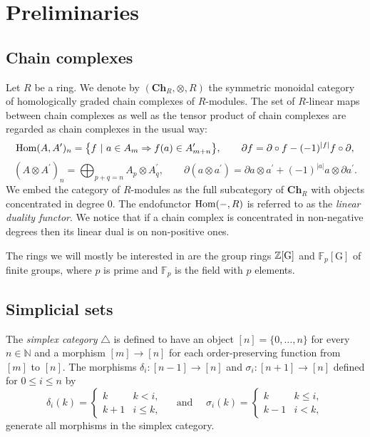 
\section{Preliminaries} \label{s:preliminaries}

\subsection{Chain complexes}
\label{s s:chain cpx}

Let $R$ be a ring. We denote by $(\mathbf{Ch}_R, \otimes, R)$ the symmetric monoidal category of homologically graded chain complexes of $R$-modules. The set of $R$-linear maps between chain complexes as well as the tensor product of chain complexes are regarded as chain complexes in the usual way:
\begin{equation*}
\mathrm{Hom}(A, A^\prime)_n = \big\{f \ |\ a \in A_m \Rightarrow f(a) \in A^\prime_{m+n} \big\}, \qquad
\partial f = \partial \circ f - (-1)^{|f|}f \circ \partial,
\end{equation*}
\begin{equation*}
(A \otimes A^\prime)_n = \bigoplus_{p + q = n} A_p \otimes A^\prime_q, \qquad \partial (a \otimes a^\prime) = \partial a \otimes a^\prime + (-1)^{|a|} a \otimes \partial a^\prime.
\end{equation*}
We embed the category of $R$-modules as the full subcategory of $\mathbf{Ch}_R$ with objects concentrated in degree $0$. The endofunctor $\mathrm{Hom}(-, R)$ is referred to as the \textit{linear duality functor}. We notice that if a chain complex is concentrated in non-negative degrees then its linear dual is on non-positive ones.

The rings we will mostly be interested in are the group rings $\mathbb{Z}[\mathrm G]$ and $\mathbb{F}_p[\mathrm G]$ of finite groups, where $p$ is prime and $\mathbb{F}_p$ is the field with $p$ elements.

\subsection{Simplicial sets}

The \textit{simplex category} $\triangle$ is defined to have an object $[n] = \{0, \dots, n\}$ for every $n \in \mathbb{N}$ and a morphism $[m] \to [n]$ for each order-preserving function from $[m]$ to $[n]$. The morphisms $\delta_i : [n-1] \to [n]$ and $\sigma_i : [n+1] \to [n]$ defined for $0 \leq i \leq n$ by
\begin{equation*}
\delta_i(k) = 
\begin{cases} k & k < i, \\ k+1 & i \leq k, \end{cases}
\quad \text{ and } \quad
\sigma_i(k) = 
\begin{cases} k & k \leq i, \\ k-1 & i < k, \end{cases}
\end{equation*} 
generate all morphisms in the simplex category.

